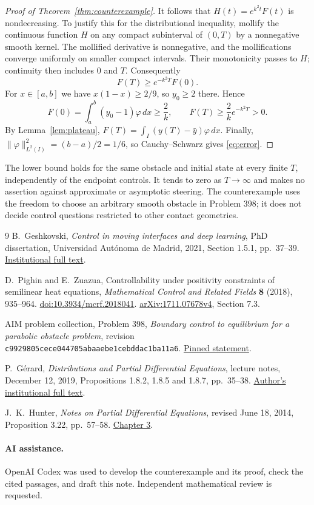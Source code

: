 \documentclass[11pt]{article}
\begin{document}
\begin{proof}[Proof of Theorem~\ref{thm:counterexample}]
It follows that $H(t)=e^{k^2t}F(t)$ is nondecreasing. To justify this for
the distributional inequality, mollify the continuous function $H$ on any
compact subinterval of $(0,T)$ by a nonnegative smooth kernel.
The mollified derivative is nonnegative, and the mollifications converge
uniformly on smaller compact intervals. Their monotonicity passes to $H$;
continuity then includes $0$ and $T$. Consequently
\[
 F(T)\ge e^{-k^2T}F(0).
\]
For $x\in[a,b]$ we have $x(1-x)\ge2/9$, so $y_0\ge2$ there. Hence
\[
 F(0)=\int_a^b(y_0-1)\varphi\,dx\ge\frac2k,
 \qquad F(T)\ge\frac2k e^{-k^2T}>0.
\]
By Lemma~\ref{lem:plateau}, $F(T)=\int_I(y(T)-\bar y)\varphi\,dx$.
Finally, $\|\varphi\|_{L^2(I)}^2=(b-a)/2=1/6$, so Cauchy--Schwarz gives
\eqref{eq:error}.
\end{proof}

The lower bound holds for the same obstacle and initial state at every
finite $T$, independently of the endpoint controls. It tends to zero as
$T\to\infty$ and makes no assertion against approximate or asymptotic
steering. The counterexample uses the freedom to choose an arbitrary smooth
obstacle in Problem 398; it does not decide control questions restricted to
other contact geometries.

\begin{thebibliography}{9}
B.~Geshkovski, \emph{Control in moving interfaces and deep learning},
PhD dissertation, Universidad Aut\'onoma de Madrid, 2021,
Section 1.5.1, pp.~37--39.
\href{https://cmc.deusto.eus/wp-content/uploads/PhDThesis-bGeshkovski-may2021.pdf}{Institutional full text}.

D.~Pighin and E.~Zuazua, Controllability under positivity constraints of
semilinear heat equations, \emph{Mathematical Control and Related Fields}
\textbf{8} (2018), 935--964.
\href{https://doi.org/10.3934/mcrf.2018041}{doi:10.3934/mcrf.2018041}.
\href{https://arxiv.org/abs/1711.07678v4}{arXiv:1711.07678v4}, Section 7.3.

AIM problem collection, Problem 398,
\emph{Boundary control to equilibrium for a parabolic obstacle problem},
revision \texttt{c9929805cece044705abaaebe1cebddac1ba11a6}.
\href{https://github.com/MColbrook/AIM/blob/c9929805cece044705abaaebe1cebddac1ba11a6/problems/398-parabolic-obstacle-boundary-control.md}{Pinned statement}.

P.~G\'erard, \emph{Distributions and Partial Differential Equations},
lecture notes, December 12, 2019,
Propositions 1.8.2, 1.8.5 and 1.8.7, pp.~35--38.
\href{https://www.imo.universite-paris-saclay.fr/~patrick.gerard/Distributions2019_Chap1,2,3.pdf}{Author's institutional full text}.

J.~K.~Hunter, \emph{Notes on Partial Differential Equations},
revised June 18, 2014, Proposition 3.22, pp.~57--58.
\href{https://www.math.ucdavis.edu/~hunter/pdes/ch3.pdf}{Chapter 3}.
\end{thebibliography}

\paragraph{AI assistance.}
OpenAI Codex was used to develop the counterexample and its proof, check
the cited passages, and draft this note. Independent mathematical review
is requested.
\end{document}
